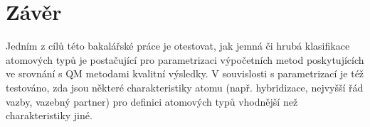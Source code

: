 \chapter{Závěr}
Jedním z cílů této bakalářské práce je otestovat, jak jemná či hrubá klasifikace atomových typů je postačující pro parametrizaci výpočetních metod poskytujících ve srovnání s QM metodami kvalitní výsledky. V souvislosti s parametrizací je též testováno, zda jsou některé charakteristiky atomu (např. hybridizace, nejvyšší řád vazby, vazebný partner) pro definici atomových typů vhodnější než charakteristiky jiné. 
